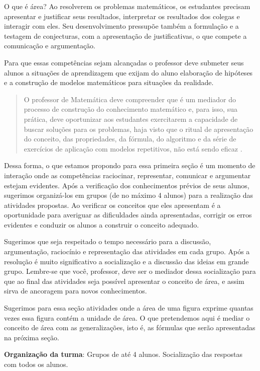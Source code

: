 \begin{paginatexto}{O que é área?}
Ao resolverem os problemas matemáticos, os estudantes precisam apresentar e justificar seus resultados, interpretar os resultados dos colegas e interagir com eles. Seu desenvolvimento pressupõe também a formulação e a testagem de conjecturas, com a apresentação de justificativas, o que compete a comunicação e argumentação.

Para que essas competências sejam alcançadas o professor deve submeter seus alunos a situações de aprendizagem que exijam do aluno elaboração de hipóteses e a construção de modelos matemáticos para situações da realidade.

\begin{quote}
O professor de Matemática deve compreender que é um mediador do processo de construção do conhecimento matemático e, para isso, sua prática, deve oportunizar aos estudantes exercitarem a capacidade de buscar soluções para os problemas, haja visto que o ritual de apresentação do conceito, das propriedades, da fórmula, do algoritmo e da série de exercícios de aplicação com modelos repetitivos, não está sendo eficaz \citep[p. 235]{santos2014}.
\end{quote}

Dessa forma, o que estamos propondo para essa primeira seção é um momento de interação onde as competências raciocinar, representar, comunicar e argumentar estejam evidentes. Após a verificação dos conhecimentos prévios de seus alunos, sugerimos organizá-los em grupos (de no máximo 4 alunos) para a realização das atividades propostas.  Ao verificar os conceitos que eles apresentam é a oportunidade para averiguar as dificuldades ainda apresentadas, corrigir os erros evidentes e conduzir os alunos a construir o conceito adequado.

Sugerimos que seja respeitado o tempo necessário para a discussão, argumentação, raciocínio e representação das atividades em cada grupo. Após a resolução é muito significativo a socialização e a discussão das ideias em grande grupo. Lembre-se que você, professor, deve ser o mediador dessa socialização para que ao final das atividades seja possível apresentar o conceito de área, e assim sirva de ancoragem para novos conhecimentos.

Sugerimos para essa seção atividades onde a área de uma figura exprime quantas vezes essa figura contém a unidade de área. O que pretendemos aqui é mediar o conceito de área com as generalizações, isto é, as fórmulas que serão apresentadas na próxima seção. 

\textbf{Organização da turma}: Grupos de até 4 alunos. Socialização das respostas com todos os alunos.


\end{paginatexto}
